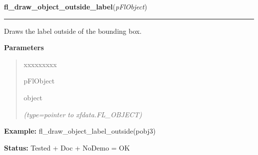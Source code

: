 \hspace{.8\funcindent}\begin{boxedminipage}{\funcwidth}

    \raggedright \textbf{fl\_draw\_object\_outside\_label}(\textit{pFlObject})

    \vspace{-1.5ex}

    \rule{\textwidth}{0.5\fboxrule}
\setlength{\parskip}{2ex}
    Draws the label outside of the bounding box.

\setlength{\parskip}{1ex}
      \textbf{Parameters}
      \vspace{-1ex}

      \begin{quote}
        \begin{Ventry}{xxxxxxxxx}

          \item[pFlObject]

          object

            {\it (type=pointer to xfdata.FL\_OBJECT)}

        \end{Ventry}

      \end{quote}

\textbf{Example:} fl\_draw\_object\_label\_outside(pobj3)



\textbf{Status:} Tested + Doc + NoDemo = OK



    \end{boxedminipage}

    \label{xformslib:flbasic:fl_get_object_component}

    \vspace{0.5ex}

